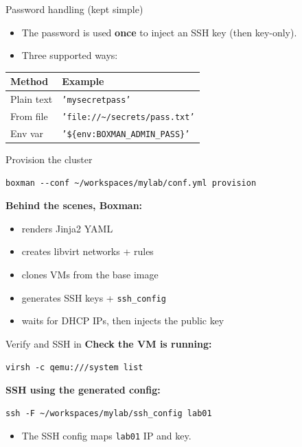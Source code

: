 \documentclass[aspectratio=169]{beamer}
\begin{document}
\begin{frame}[fragile]{Password handling (kept simple)}
\begin{itemize}
  \item The password is used \textbf{once} to inject an SSH key (then key-only).
  \item Three supported ways:
\end{itemize}
\vspace{0.5em}
\begin{tabular}{@{}p{}p{}@{}}
\toprule
\textbf{Method} & \textbf{Example} \\
\midrule
Plain text & \texttt{'mysecretpass'} \\
From file & \texttt{'file://\textasciitilde /secrets/pass.txt'} \\
Env var & \texttt{'\$\{env:BOXMAN\_ADMIN\_PASS\}'} \\
\bottomrule
\end{tabular}
\end{frame}

\begin{frame}[fragile]{Provision the cluster}
\begin{lstlisting}[style=boxman]
boxman --conf ~/workspaces/mylab/conf.yml provision
\end{lstlisting}
\textbf{Behind the scenes, Boxman:}
\begin{itemize}
  \item renders Jinja2 \textrightarrow{} YAML
  \item creates libvirt networks + rules
  \item clones VMs from the base image
  \item generates SSH keys + \texttt{ssh\_config}
  \item waits for DHCP IPs, then injects the public key
\end{itemize}
\end{frame}

\begin{frame}[fragile]{Verify and SSH in}
\textbf{Check the VM is running:}
\begin{lstlisting}[style=boxman]
virsh -c qemu:///system list
\end{lstlisting}
\textbf{SSH using the generated config:}
\begin{lstlisting}[style=boxman]
ssh -F ~/workspaces/mylab/ssh_config lab01
\end{lstlisting}
\begin{itemize}
  \item The SSH config maps \texttt{lab01} \textrightarrow{} IP and key.
\end{itemize}
\end{frame}
\end{document}
